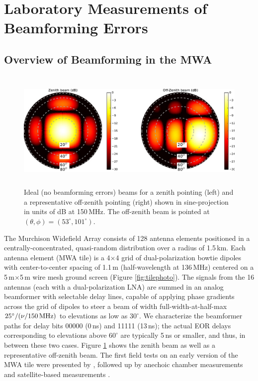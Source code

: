 \section{Laboratory Measurements of Beamforming Errors}
\label{sec:measurements}

\subsection{Overview of Beamforming in the MWA}

 \begin{figure}[t]
 \centering
\includegraphics[height=2.3in]{chap2_beamforming_errors/zenith_and_offzenith_beams-eps-converted-to.pdf}
\caption[Ideal (no beamforming errors) beams for zenith (left) and off-zenith (right) pointings.]{Ideal (no beamforming errors) beams for a zenith pointing (left) and a representative off-zenith pointing (right) shown in sine-projection in units of dB at 150\,MHz. The off-zenith beam is pointed at $(\theta,\phi) = (53^\circ,101^\circ)$. }
\label{fig:idealbeams}
\end{figure}

The Murchison Widefield Array consists of 128 antenna elements positioned in a centrally-concentrated, quasi-random distribution over a radius of 1.5\,km. Each antenna element (MWA tile) is a 4$\times$4 grid of dual-polarization bowtie dipoles with center-to-center spacing of 1.1\,m (half-wavelength at 136\,MHz) centered on a 5\,m$ \times $5\,m wire mesh ground screen (Figure \ref{fig:tilephoto}). The signals from the 16 antennas (each with a dual-polarization LNA) are summed in an analog beamformer with selectable delay lines, capable of applying phase gradients across the grid of dipoles to steer a beam of width full-width-at-half-max $25^\circ/(\nu/150\text{\,MHz})$ to elevations as low as $30^\circ$. We characterize the beamformer paths for delay bits 00000 (0\,ns) and 11111 (13\,ns); the actual EOR delays corresponding to elevations above $60^\circ$ are typically 5\,ns or smaller, and thus, in between these two cases. Figure \ref{fig:idealbeams} shows the zenith beam as well as a representative off-zenith beam. The first field tests on an early version of the MWA tile were presented by \citet{bowman07}, followed up by anechoic chamber measurements \citep{williamsthesis2012} and satellite-based measurements  \citep{neben15}.


